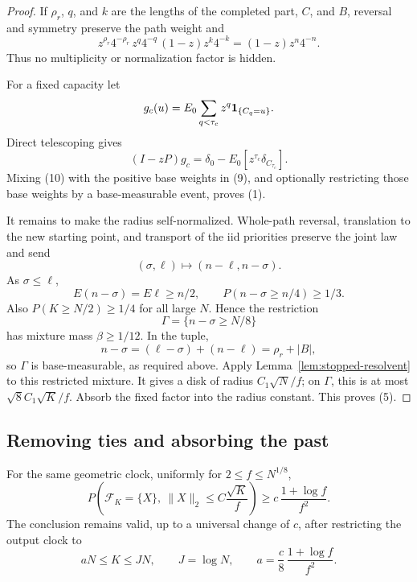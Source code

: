 \begin{proof}
If \(\rho_r\), \(q\), and \(k\) are the lengths of the completed part,
\(C\), and \(B\), reversal and symmetry preserve the path weight and
\begin{equation}
z^{\rho_r}4^{-\rho_r}\,
 z^q4^{-q}\,(1-z)z^k4^{-k}
       =(1-z)z^n4^{-n}.                                      \tag{9}
\end{equation}
Thus no multiplicity or normalization factor is hidden.

For a fixed capacity let
\[
       g_c(u)=E_0\sum_{q<\tau_c}z^q{\bf1}_{\{C_q=u\}}.
\]
Direct telescoping gives
\begin{equation}
(I-zP)g_c=\delta_0-E_0[z^{\tau_c}\delta_{C_{\tau_c}}].  \tag{10}
\end{equation}
Mixing (10) with the positive base weights in (9), and optionally
restricting those base weights by a base-measurable event, proves (1).

It remains to make the radius self-normalized.  Whole-path reversal,
translation to the new starting point, and transport of the iid priorities
preserve the joint law and send
\[
       (\sigma,\ell)\longmapsto(n-\ell,n-\sigma).
\]
As \(\sigma\le\ell\),
\begin{equation}
E(n-\sigma)=E\ell\ge n/2,
       \qquad P(n-\sigma\ge n/4)\ge1/3.                        \tag{11}
\end{equation}
Also \(P(K\ge N/2)\ge1/4\) for all large \(N\).  Hence the restriction
\[
       \Gamma=\{n-\sigma\ge N/8\}
\]
has mixture mass \(\beta\ge1/12\).  In the tuple,
\[
       n-\sigma=(\ell-\sigma)+(n-\ell)=\rho_r+|B|,
\]
so \(\Gamma\) is base-measurable, as required above.  Apply Lemma~\ref{lem:stopped-resolvent} to this restricted mixture. It gives a disk of radius $C_1\sqrt N/f$; on $\Gamma$, this is at most $\sqrt8 C_1\sqrt K/f$. Absorb the fixed factor into the radius constant.  This proves (5).
\end{proof}

\subsection{Removing ties and absorbing the past}

\begin{lemma}\label{lem:singleton-geometric-localization}
For the same geometric clock, uniformly for \(2\le f\le N^{1/8}\),
\begin{equation}
P\left(\mathcal F_K=\{X\},\
        \lVert X\rVert_2\le C\frac{\sqrt K}{f}\right)
       \ge c\,\frac{1+\log f}{f^2}.                            \tag{12}
\end{equation}
The conclusion remains valid, up to a universal change of \(c\), after
restricting the output clock to
\begin{equation}
aN\le K\le JN,\qquad J=\log N,\qquad
       a=\frac c8\,\frac{1+\log f}{f^2}.                       \tag{13}
\end{equation}
\end{lemma}

